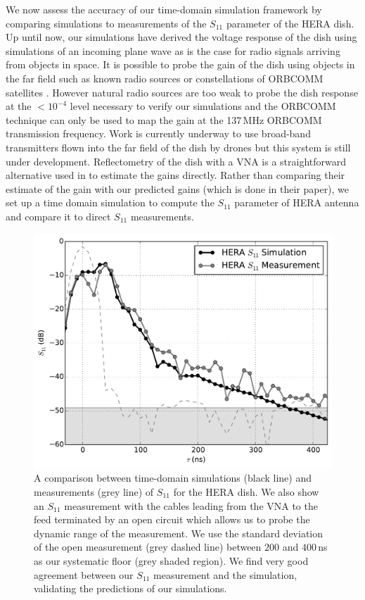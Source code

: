 \documentclass[twocolumn]{emulateapj}
\begin{document}
We now assess the accuracy of our time-domain simulation framework by comparing simulations to measurements of the $S_{11}$ parameter of the HERA dish. Up until now, our simulations have derived the voltage response of the dish using simulations of an incoming plane wave as is the case for radio signals arriving from objects in space. It is possible to probe the gain of the dish using objects in the far field such as known radio sources \citep{Thyagarajan:2011,Pober:2012,Colgate:2015} or constellations of ORBCOMM satellites \citep{Neben:2015,Neben:2016}. However natural radio sources are too weak to probe the dish response at the $<10^{-4}$ level necessary to verify our simulations and the ORBCOMM technique can only be used to map the gain at the 137\,MHz ORBCOMM transmission frequency. Work is currently underway to use broad-band transmitters flown into the far field of the dish by drones \citep{Jacobs:2016} but this system is still under development. Reflectometry of the dish with a VNA is a straightforward alternative used in \citet{Patra:2016} to estimate the gains directly. Rather than comparing their estimate of the gain with our predicted gains (which is done in their paper), we set up a time domain simulation to compute the $S_{11}$ parameter of HERA antenna and compare it to direct $S_{11}$ measurements.
\begin{figure}
\includegraphics[width=.5\textwidth]{figures/s11_compare.pdf}
\caption{A comparison between time-domain simulations (black line) and measurements (grey line) of $S_{11}$ for the HERA dish. We also show an $S_{11}$ measurement with the cables leading from the VNA to the feed terminated by an open circuit which allows us to probe the dynamic range of the measurement. We use the standard deviation of the open measurement (grey dashed line) between $200$ and $400$\,ns as our systematic floor (grey shaded region). We find very good agreement between our $S_{11}$ measurement and the simulation, validating the predictions of our simulations.}
\label{fig:S11}
\end{figure}
 
\end{document}
